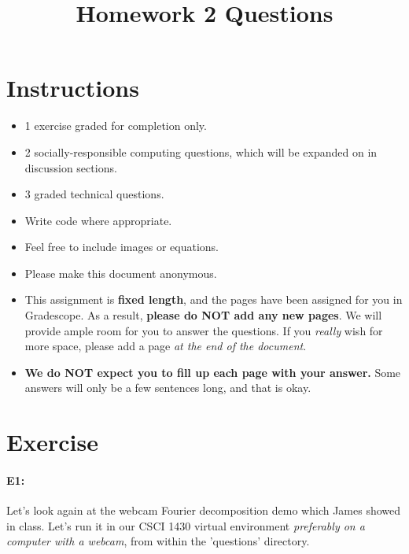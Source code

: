 \date{}

\title{\vspace{-1cm}Homework 2 Questions}



\maketitle
\vspace{-3cm}
\thispagestyle{fancy}

\section*{Instructions}
\begin{itemize}
  \item 1 exercise graded for completion only.
  \item 2 socially-responsible computing questions, which will be expanded on in discussion sections.
  \item 3 graded technical questions.
  \item Write code where appropriate.
  \item Feel free to include images or equations.
  \item Please make this document anonymous.
  \item This assignment is \textbf{fixed length}, and the pages have been assigned for you in Gradescope. As a result, \textbf{please do NOT add any new pages}. We will provide ample room for you to answer the questions. If you \emph{really} wish for more space, please add a page \emph{at the end of the document}.
  \item \textbf{We do NOT expect you to fill up each page with your answer.} Some answers will only be a few sentences long, and that is okay.
\end{itemize}
\pagebreak


\section*{Exercise}

\paragraph{E1:} Let's look again at the webcam Fourier decomposition demo which James showed in class. Let's run it in our CSCI 1430 virtual environment \emph{preferably on a computer with a webcam}, from within the 'questions' directory.


